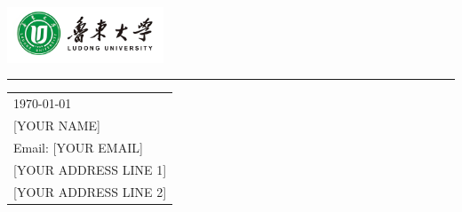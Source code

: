 \documentclass{article}
\begin{document}

\includegraphics[width=0.35\textwidth]{logo.jpg} %

\vspace{-1em} %

\rule{\linewidth}{1pt} %

\bigskip\bigskip %


\hfill
\begin{tabular}{l @{}}
	\hfill \today \bigskip                          \\ %
	\hfill [YOUR NAME]                              \\ %
	\hfill Email: [YOUR EMAIL]                      \\ %
	\hfill [YOUR ADDRESS LINE 1]                    \\ %
	\hfill [YOUR ADDRESS LINE 2]                    \\ %
\end{tabular}

\bigskip %


\end{document}

